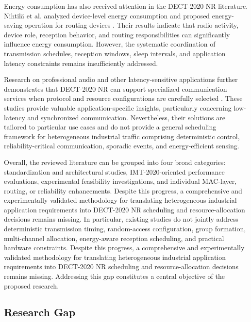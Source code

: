 \documentclass[12pt,a4paper]{article}
\begin{document}
Energy consumption has also received attention in the DECT-2020 NR literature. Nihtilä et al. analyzed device-level energy consumption and proposed energy-saving operation for routing devices
\cite{nihtilaEnergyConsumptionDECT20202022,
nihtilaEnergySavingRouter2022}.
Their results indicate that radio activity, device role, reception behavior, and routing responsibilities can significantly influence energy consumption. However, the systematic coordination of transmission schedules, reception windows, sleep intervals, and application latency constraints remains insufficiently addressed.

Research on professional audio and other latency-sensitive applications further demonstrates that DECT-2020 NR can support specialized communication services when protocol and resource configurations are carefully selected
\cite{durreDECT2020NRProfessional2024,
poetsProfessionalNetworkedAudio2025}.
These studies provide valuable application-specific insights, particularly concerning low-latency and synchronized communication. Nevertheless, their solutions are tailored to particular use cases and do not provide a general scheduling framework for heterogeneous industrial traffic comprising deterministic control, reliability-critical communication, sporadic events, and energy-efficient sensing.

Overall, the reviewed literature can be grouped into four broad categories: standardization and architectural studies, IMT-2020-oriented performance evaluations, experimental feasibility investigations, and individual MAC-layer, routing, or reliability enhancements. Despite this progress, a comprehensive and experimentally validated methodology for translating heterogeneous industrial application requirements into DECT-2020 NR scheduling and resource-allocation decisions remains missing. In particular, existing studies do not jointly address deterministic transmission timing, random-access configuration, group formation, multi-channel allocation, energy-aware reception scheduling, and practical hardware constraints. 
Despite this progress, a comprehensive and experimentally validated methodology
for translating heterogeneous industrial application requirements into
DECT-2020 NR scheduling and resource-allocation decisions remains missing.
Addressing this gap constitutes a central objective of the proposed research.

\subsection{Research Gap}
\label{subsec:research_gap}
\end{document}
